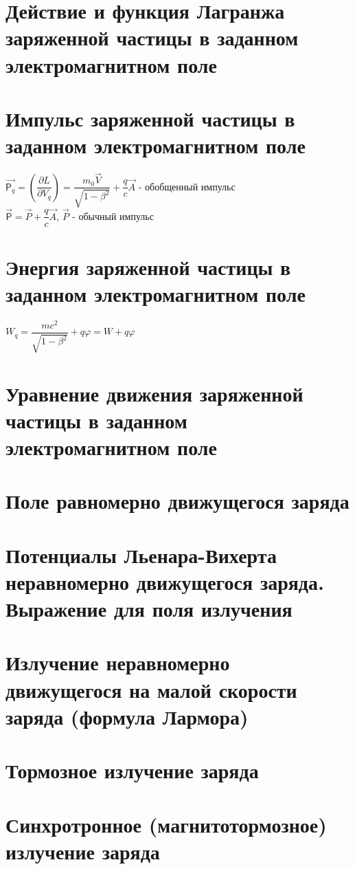 \begin{multicols*}{2}
		\section{Действие и функция Лагранжа заряженной частицы в заданном электромагнитном поле}
		
		\section{Импульс заряженной частицы в заданном электромагнитном поле}
		$\vec{\mathsf{P}_q} = (\dfrac{\partial L}{\partial V_q}) = \dfrac{m_0\vec{V}}{\sqrt{1-\beta^2}} + \dfrac{q}{c}\vec{A}$ - обобщенный импульс\\
		$\vec{\mathsf{P}} = \vec{P} + \dfrac{q}{c}\vec{A}$, \quad $\vec{P}$ - обычный импульс
		
		\section{Энергия заряженной частицы в заданном электромагнитном поле}
		$W_q = \dfrac{mc^2}{\sqrt{1-\beta^2}} + q\varphi = W + q\varphi$
		
		\section{Уравнение движения заряженной частицы в заданном электромагнитном поле}
		
		\section{Поле равномерно движущегося заряда}
		
		\section{Потенциалы Льенара-Вихерта неравномерно движущегося заряда. Выражение для поля излучения}
		
		\section{Излучение неравномерно движущегося на малой скорости заряда (формула Лармора)}
		
		\section{Тормозное излучение заряда}
		
		\section{Синхротронное (магнитотормозное) излучение заряда}
		

\end{multicols*}
